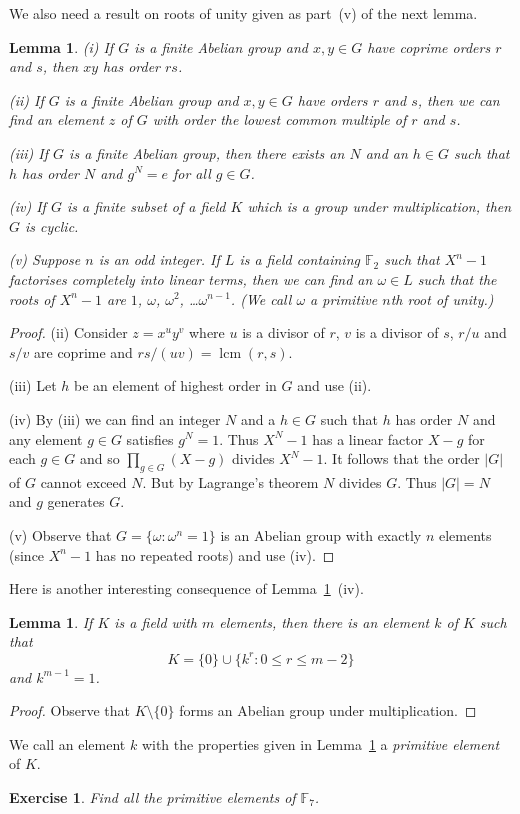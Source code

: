 \documentclass[12pt,a4paper]{article}
\theoremstyle{plain}
\newtheorem{lemma}[theorem]{Lemma}
\newtheorem{exercise}[theorem]{Exercise}
\theoremstyle{definition}
\newcommand{\lcm}{\operatorname{lcm}}
\begin{document}
We also need a result on roots of unity
given as part~(v) of the next lemma.
\begin{lemma}\label{primitive} (i) If $G$
is a finite Abelian
group and $x,y\in G$ have coprime orders
$r$ and $s$, then $xy$ has order $rs$.

(ii) If $G$ is a finite Abelian
group and $x,y\in G$ have orders
$r$ and $s$, then we can find an element
$z$ of $G$ with order the lowest common multiple
of $r$ and $s$.

(iii) If $G$ is a finite Abelian
group, then there exists an $N$ and
an $h\in G$ such that $h$ has order $N$
and $g^{N}=e$ for all $g\in G$.

(iv) If $G$ is a finite subset of a field $K$
which is a group under multiplication, then
$G$ is cyclic.

(v) Suppose $n$ is an odd integer.
If $L$ is a field containing ${\mathbb F}_{2}$
such that $X^{n}-1$ factorises completely
into linear terms, then we can find
an $\omega\in L$ such that the roots
of $X^{n}-1$ are $1$, $\omega$, $\omega^{2}$,
\dots $\omega^{n-1}$. (We call $\omega$ a
\emph{primitive} $n$th root of unity.)
\end{lemma}
\begin{proof} (ii) Consider $z=x^{u}y^{v}$
where $u$ is a divisor of $r$, $v$ is a divisor
of $s$, $r/u$ and $s/v$ are coprime and
$rs/(uv)=\lcm(r,s)$.

(iii) Let $h$ be an element of highest order
in $G$ and use (ii).

(iv) By (iii) we can find an integer
$N$ and a $h\in G$ such that $h$
has order $N$ and any element $g\in G$
satisfies $g^{N}=1$. Thus $X^{N}-1$
has a linear factor $X-g$ for each $g\in G$
and so $\prod_{g\in G}(X-g)$ divides $X^{N}-1$.
It follows that the order $|G|$ of $G$ cannot
exceed $N$. But by Lagrange's theorem $N$ divides $G$.
Thus $|G|=N$ and $g$ generates $G$.

(v) Observe that $G=\{\omega:\omega^{n}=1\}$ is
an Abelian group with exactly $n$ elements
(since $X^{n}-1$ has no repeated roots) and
use (iv).
\end{proof}

Here is another interesting consequence of
Lemma~\ref{primitive}~(iv).
\begin{lemma}\label{primitive field}
If $K$ is a field with $m$ elements,
then there is an
element $k$ of $K$ such that
\[K=\{0\}\cup\{k^{r}:0\leq r\leq m-2\}\]
and $k^{m-1}=1$.
\end{lemma}
\begin{proof} Observe that $K\setminus\{0\}$ forms 
an Abelian group
under multiplication.
\end{proof}
We call an element $k$ with the properties
given in Lemma~\ref{primitive field}
a \emph{primitive element} of $K$.
\begin{exercise} Find all the primitive elements of ${\mathbb F}_{7}$.
\end{exercise}
\end{document}
